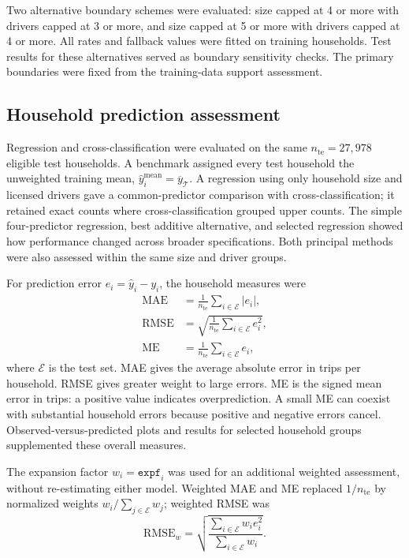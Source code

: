 Two alternative boundary schemes were evaluated: size capped at 4 or more with drivers capped at 3 or more, and size capped at 5 or more with drivers capped at 4 or more. All rates and fallback values were fitted on training households. Test results for these alternatives served as boundary sensitivity checks. The primary boundaries were fixed from the training-data support assessment.

\subsection{Household prediction assessment}
Regression and cross-classification were evaluated on the same $n_{\mathrm{te}}=27,978$ eligible test households. A benchmark assigned every test household the unweighted training mean, $\widehat y_i^{\mathrm{mean}}=\overline y_{\mathcal T}$. A regression using only household size and licensed drivers gave a common-predictor comparison with cross-classification; it retained exact counts where cross-classification grouped upper counts. The simple four-predictor regression, best additive alternative, and selected regression showed how performance changed across broader specifications. Both principal methods were also assessed within the same size and driver groups.

For prediction error $e_i=\widehat y_i-y_i$, the household measures were
\begin{align}
 \mathrm{MAE}&=\frac{1}{n_{\mathrm{te}}}\sum_{i\in\mathcal E}|e_i|,\\
 \mathrm{RMSE}&=\sqrt{\frac{1}{n_{\mathrm{te}}}\sum_{i\in\mathcal E}e_i^2},\\
 \mathrm{ME}&=\frac{1}{n_{\mathrm{te}}}\sum_{i\in\mathcal E}e_i,
\end{align}
where $\mathcal E$ is the test set. MAE gives the average absolute error in trips per household. RMSE gives greater weight to large errors. ME is the signed mean error in trips: a positive value indicates overprediction. A small ME can coexist with substantial household errors because positive and negative errors cancel. Observed-versus-predicted plots and results for selected household groups supplemented these overall measures.

The expansion factor $w_i=\texttt{expf}_i$ was used for an additional weighted assessment, without re-estimating either model. Weighted MAE and ME replaced $1/n_{\mathrm{te}}$ by normalized weights $w_i/\sum_{j\in\mathcal E}w_j$; weighted RMSE was
\begin{equation}
 \mathrm{RMSE}_{w}=\sqrt{\frac{\sum_{i\in\mathcal E}w_i e_i^2}
                                  {\sum_{i\in\mathcal E}w_i}}.
\end{equation}

